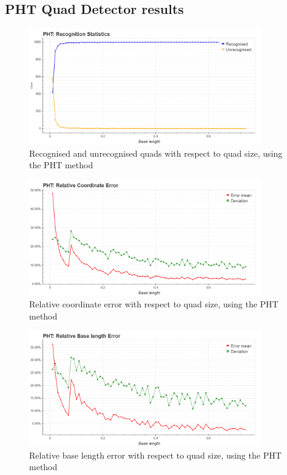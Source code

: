 \clearpage

\subsection{PHT Quad Detector results}

\begin{figure}[ht]
	\centering
	\includegraphics[width=0.9\textwidth]{figures/plots/pht_rec_unrec_count.png}
	\caption{Recognised and unrecognised quads with respect to quad size, using the PHT method}
	\label{fig:phtRecCnt}
\end{figure}

\begin{figure}[ht]
	\centering
	\includegraphics[width=0.9\textwidth]{figures/plots/pht_relative_coordinate_error.png}
	\caption{Relative coordinate error with respect to quad size, using the PHT method}
	\label{fig:phtRelCoordErr}
\end{figure}

\begin{figure}[ht]
	\centering
	\includegraphics[width=0.9\textwidth]{figures/plots/pht_relative_base_length_error.png}
	\caption{Relative base length error with respect to quad size, using the PHT method}
	\label{fig:phtRelBaseErr}
\end{figure}


